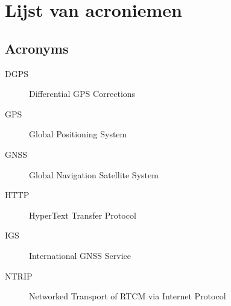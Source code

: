 \chapter*{Lijst van acroniemen}

\section*{Acronyms}
\begin{description}
	\item[DGPS] Differential GPS Corrections
	\item[GPS] Global Positioning System
	\item[GNSS] Global Navigation Satellite System
	\item[HTTP] HyperText Transfer Protocol
	\item[IGS] International GNSS Service
	\item[NTRIP] Networked Transport of RTCM via Internet Protocol
\end{description}

